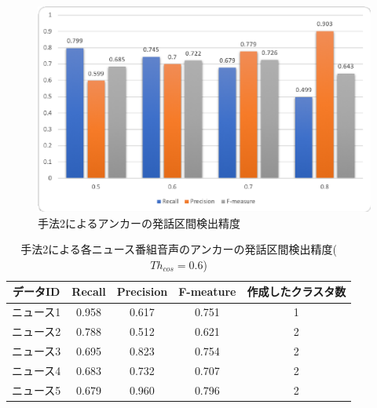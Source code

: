 \begin{figure}[H]
  \begin{center}
    \includegraphics[scale=0.8]{./figure/get_anchor_prob2.eps}
  \end{center}
  \caption{手法2によるアンカーの発話区間検出精度 \label{fig:result_anchor_prob2}}
\end{figure}

\begin{table}[H]
  \begin{center}
    \caption{手法2による各ニュース番組音声のアンカーの発話区間検出精度($Th_{cos}=0.6$) \label{table:NHK_pause_RPF}}
    \begin{tabular}{|c||c|c|c|c|} \hline
データID & Recall & Precision & F-meature & 作成したクラスタ数\\ \hline
ニュース1 & 0.958 & 0.617 & 0.751 & 1 \\ \hline
ニュース2 & 0.788 & 0.512 & 0.621 & 2 \\ \hline
ニュース3 & 0.695 & 0.823 & 0.754 & 2 \\ \hline
ニュース4 & 0.683 & 0.732 & 0.707 & 2 \\ \hline
ニュース5 & 0.679 & 0.960 & 0.796 & 2 \\ \hline
    \end{tabular}
  \end{center}
\end{table}

